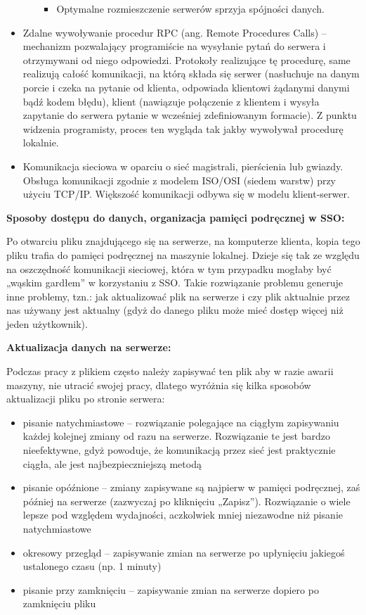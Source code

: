 \begin{itemize}
\begin{itemize}
\begin{itemize}
			\item Optymalne rozmieszczenie serwerów sprzyja spójności danych.
		\end{itemize}
	\end{itemize}
	\item Zdalne wywoływanie procedur RPC (ang. Remote Procedures Calls) – mechanizm pozwalający programiście na wysyłanie pytań do serwera i otrzymywani od niego odpowiedzi. Protokoły realizujące tę procedurę, same realizują całość komunikacji, na którą składa się serwer (nasłuchuje na danym porcie i czeka na pytanie od klienta, odpowiada klientowi żądanymi danymi bądź kodem błędu), klient (nawiązuje połączenie z klientem i wysyła zapytanie do serwera pytanie w wcześniej zdefiniowanym formacie). Z punktu widzenia programisty, proces ten wygląda tak jakby wywoływał procedurę lokalnie.
	\item Komunikacja sieciowa w oparciu o sieć magistrali, pierścienia lub gwiazdy. Obsługa komunikacji zgodnie z modelem ISO/OSI (siedem warstw) przy użyciu TCP/IP. Większość komunikacji odbywa się w modelu klient-serwer.

\end{itemize}

\textbf{Sposoby dostępu do danych, organizacja pamięci podręcznej w SSO:}

Po otwarciu pliku znajdującego się na serwerze, na komputerze klienta, kopia tego pliku trafia do pamięci podręcznej na maszynie lokalnej. Dzieje się tak ze względu na oszczędność komunikacji sieciowej, która w tym przypadku mogłaby być „wąskim gardłem” w korzystaniu z SSO. Takie rozwiązanie problemu generuje inne problemy, tzn.: jak aktualizować plik na serwerze i czy plik aktualnie przez nas używany jest aktualny (gdyż do danego pliku może mieć dostęp więcej niż jeden użytkownik).
 
\textbf{Aktualizacja danych na serwerze:}

Podczas pracy z plikiem często należy zapisywać ten plik aby w razie awarii maszyny, nie utracić swojej pracy, dlatego wyróżnia się kilka sposobów aktualizacji pliku po stronie serwera:
\begin{itemize}
	\item pisanie natychmiastowe – rozwiązanie polegające na ciągłym zapisywaniu każdej kolejnej zmiany od razu na serwerze. Rozwiązanie te jest bardzo nieefektywne, gdyż powoduje, że komunikacją przez sieć jest praktycznie ciągła, ale jest najbezpieczniejszą metodą
	\item pisanie opóźnione – zmiany zapisywane są najpierw w pamięci podręcznej, zaś później na serwerze (zazwyczaj po kliknięciu „Zapisz”). Rozwiązanie o wiele lepsze pod względem wydajności, aczkolwiek mniej niezawodne niż pisanie natychmiastowe
	\item okresowy przegląd – zapisywanie zmian na serwerze po upłynięciu jakiegoś ustalonego czasu (np. 1 minuty)
	\item pisanie przy zamknięciu – zapisywanie zmian na serwerze dopiero po zamknięciu pliku
\end{itemize}

